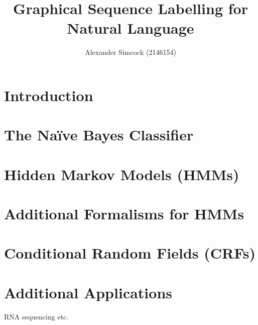 \documentclass[12pt]{article}
\title{Graphical Sequence Labelling for Natural Language}
\author{Alexander Simcock (2146154)}
\date{}
\begin{document}

\maketitle

\section{Introduction}


\section{The Na{\"i}ve Bayes Classifier}


\section{Hidden Markov Models (HMMs)}


\section{Additional Formalisms for HMMs}


%

\section{Conditional Random Fields (CRFs)}


\section{Additional Applications}
RNA sequencing etc.

\printbibliography
\end{document}
